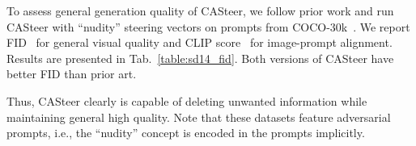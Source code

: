 To assess general generation quality of CASteer, we follow prior work and run CASteer with ``nudity'' steering vectors on prompts from COCO-30k~\cite{DBLP:conf/eccv/LinMBHPRDZ14}. We report FID~\cite{DBLP:conf/nips/HeuselRUNH17} for general visual quality and CLIP score~\cite{DBLP:conf/emnlp/HesselHFBC21} for image-prompt alignment. Results are presented in Tab.~\ref{table:sd14_fid}. Both versions of CASteer have better FID than prior art. 

%
Thus, CASteer clearly is capable of deleting unwanted information while maintaining general high quality. Note that these datasets feature adversarial prompts, i.e., the ``nudity'' concept is encoded in the prompts implicitly.





